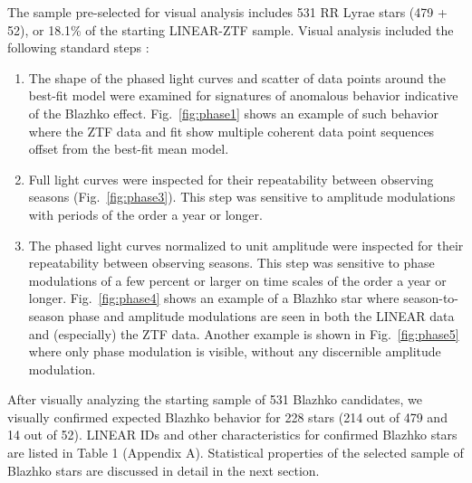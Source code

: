 The sample pre-selected for visual analysis includes 531 RR Lyrae stars (479 + 52),
or 18.1\% of the starting LINEAR-ZTF sample. Visual analysis included the following standard steps
\citep[e.g.,][]{2009MNRAS.400.1006J, 2017MNRAS.466.2602P}: 
\begin{enumerate}
\item The shape of the phased light curves and scatter of data points around the best-fit model were examined
    for signatures of anomalous behavior indicative of the Blazhko effect. 
    Fig.~\ref{fig:phase1} shows an example of such behavior where the ZTF data and fit show multiple coherent data point sequences
    offset from the best-fit mean model. 
  \item Full light curves were inspected for their repeatability between observing seasons (Fig.~\ref{fig:phase3}).
       This step was sensitive to amplitude modulations with periods of the order a year or longer.  
     \item The phased light curves normalized to unit amplitude were inspected for their repeatability between observing seasons.
       This step was sensitive to phase modulations of a few percent or larger on time scales of the order a year or longer.  
       Fig.~\ref{fig:phase4} shows an example of a Blazhko star where season-to-season phase and amplitude modulations
       are seen in both the LINEAR data and (especially) the ZTF data. Another example is shown in Fig.~\ref{fig:phase5}
       where only phase modulation is visible,  without any discernible amplitude modulation.
\end{enumerate}

After visually analyzing the starting sample of 531 Blazhko candidates, we visually confirmed expected Blazhko
behavior for 228 stars (214 out of 479 and 14 out of 52). LINEAR IDs and other characteristics for confirmed
Blazhko stars are listed in Table 1 (Appendix A). Statistical properties of the selected sample of Blazhko stars are
discussed in detail in the next section. 

